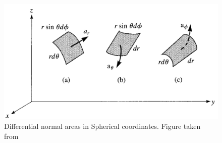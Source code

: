 \documentclass[12pt,a4paper]{article}
\begin{document}
\begin{figure}[h]
\centering
\includegraphics[scale=0.3]{Figure3-6S.png}
\caption{Differential normal areas in Spherical coordinates. Figure taken from~\cite[Figure 3.6, page 57]{Sadiku}}
\label{Spherical-differential-area}
\end{figure}
\end{document}
